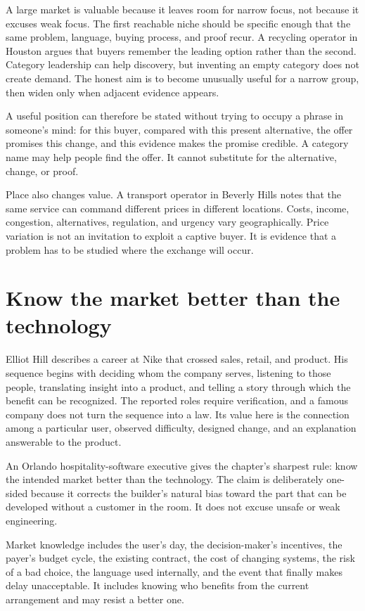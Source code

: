 A large market is valuable because it leaves room for narrow focus, not because
it excuses weak focus. The first reachable niche should be specific enough that
the same problem, language, buying process, and proof recur. A recycling
operator in Houston argues that buyers remember the leading option rather than
the second. Category leadership can help discovery, but inventing an empty
category does not create demand. The honest aim is to become unusually useful
for a narrow group, then widen only when adjacent evidence appears.

A useful position can therefore be stated without trying to occupy a phrase in
someone's mind: for this buyer, compared with this present alternative, the
offer promises this change, and this evidence makes the promise credible. A
category name may help people find the offer. It cannot substitute for the
alternative, change, or proof.

Place also changes value. A transport operator in Beverly Hills notes that the
same service can command different prices in different locations. Costs,
income, congestion, alternatives, regulation, and urgency vary geographically.
Price variation is not an invitation to exploit a captive buyer. It is evidence
that a problem has to be studied where the exchange will occur.

\section{Know the market better than the technology}

Elliot Hill describes a career at Nike that crossed sales, retail, and product.
His sequence begins with deciding whom the company serves, listening to those
people, translating insight into a product, and telling a story through which
the benefit can be recognized. The reported roles require verification, and a
famous company does not turn the sequence into a law. Its value here is the
connection among a particular user, observed difficulty, designed change, and
an explanation answerable to the product.

An Orlando hospitality-software executive gives the chapter's sharpest rule:
know the intended market better than the technology. The claim is deliberately
one-sided because it corrects the builder's natural bias toward the part that
can be developed without a customer in the room. It does not excuse unsafe or
weak engineering.

Market knowledge includes the user's day, the decision-maker's incentives, the
payer's budget cycle, the existing contract, the cost of changing systems, the
risk of a bad choice, the language used internally, and the event that finally
makes delay unacceptable. It includes knowing who benefits from the current
arrangement and may resist a better one.

